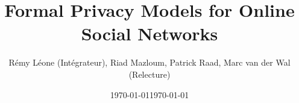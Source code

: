 \documentclass{article}
\date{\today}
\title{Formal Privacy Models for Online Social Networks}
\author{Rémy Léone (Intégrateur), Riad Mazloum, Patrick Raad, Marc van der Wal (Relecture)}
\date{\today}
\begin{document}
\maketitle



\begin{multicols}{2}




















\nocite{*}

{}

\end{multicols}

\appendix

\pagebreak

\end{document}

